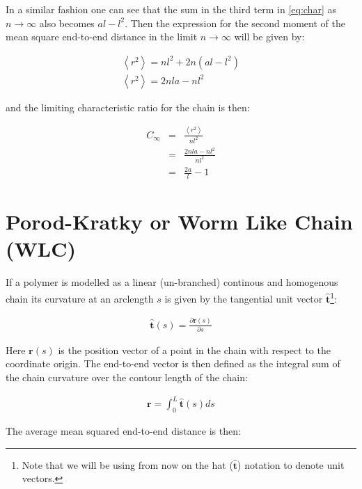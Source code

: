 In a similar fashion one can see that the sum in the third term in
\ref{eq:char} as $n \to \infty$ also becomes $al-l^{2}$.
Then the expression for the second moment of the mean square
end-to-end distance in the limit $n \to \infty$ will be given by:

\begin{gather}
\left<r^{2}\right> = nl^{2} + 2n(al-l^{2})\\
\left<r^{2}\right> = 2nla - nl^{2}
\end{gather}  

and the limiting characteristic ratio for the chain is then:

\begin{eqnarray}
C_{\infty} & =  & \frac{\left<r^{2}\right>}{ nl^{2}}\\
          & =  & \frac{2nla - nl^{2}}{nl^{2}}\\
          & =  & \frac{2a}{l} - 1
\end{eqnarray}  

\section{Porod-Kratky or Worm Like Chain (WLC)}
If a polymer is modelled as a linear (un-branched) continous and
homogenous chain its curvature at an arclength $s$ is given by the
tangential unit vector $\hat{\mathbf{t}}$\footnote{Note that we will
be using from now on the hat ($\hat{\mathbf{t}}$) notation to denote
unit vectors.}:

\begin{gather}
\hat{\mathbf{t}}(s)=\frac{\partial{\textbf{r}(s)}}{\partial{s}}
\end{gather}

Here $\textbf{r}(s)$ is the position vector of a point in the chain
with respect to the coordinate origin.
The end-to-end vector is then defined as the integral sum of the chain
curvature over the contour length of the chain:

\begin{gather}
\textbf{r}=\int_{0}^{L}\hat{\textbf{t}}(s)ds
\end{gather}

The average mean squared end-to-end distance is then:

